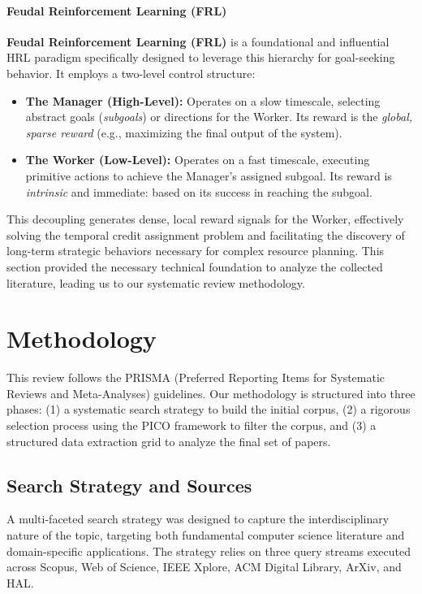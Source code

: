 \documentclass[conference]{IEEEtran}
\begin{document}
\paragraph{Feudal Reinforcement Learning (FRL)}

\textbf{Feudal Reinforcement Learning (FRL)} \cite{dayanFeudalReinforcementLearning1992} is a foundational and influential HRL paradigm specifically designed to leverage this hierarchy for goal-seeking behavior. It employs a two-level control structure:
\begin{itemize}
    \item \textbf{The Manager (High-Level):} Operates on a slow timescale, selecting abstract goals (\textit{subgoals}) or directions for the Worker. Its reward is the \textit{global, sparse reward} (e.g., maximizing the final output of the system).
    \item \textbf{The Worker (Low-Level):} Operates on a fast timescale, executing primitive actions to achieve the Manager's assigned subgoal. Its reward is \textit{intrinsic} and immediate: based on its success in reaching the subgoal.
\end{itemize}
This decoupling generates dense, local reward signals for the Worker, effectively solving the temporal credit assignment problem and facilitating the discovery of long-term strategic behaviors necessary for complex resource planning. This section provided the necessary technical foundation to analyze the collected literature, leading us to our systematic review methodology.

\section{Methodology}

This review follows the PRISMA (Preferred Reporting Items for Systematic Reviews and Meta-Analyses) guidelines. Our methodology is structured into three phases: (1) a systematic search strategy to build the initial corpus, (2) a rigorous selection process using the PICO framework to filter the corpus, and (3) a structured data extraction grid to analyze the final set of papers.

\subsection{Search Strategy and Sources}

A multi-faceted search strategy was designed to capture the interdisciplinary nature of the topic, targeting both fundamental computer science literature and domain-specific applications. The strategy relies on three query streams executed across Scopus, Web of Science, IEEE Xplore, ACM Digital Library, ArXiv, and HAL.
\end{document}
